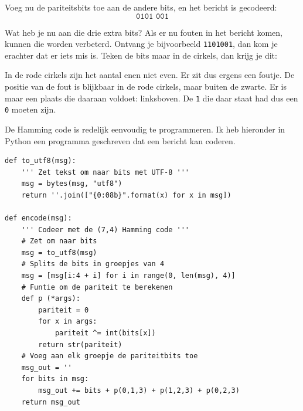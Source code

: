 \documentclass[a4paper]{article}
\begin{document}
Voeg nu de pariteitsbits toe aan de andere bits, en het bericht is gecodeerd:
\[\texttt{0101 001}\]

Wat heb je nu aan die drie extra bits? Als er nu fouten in het bericht komen, kunnen die worden verbeterd. Ontvang je bijvoorbeeld \texttt{1101001}, dan kom je erachter dat er iets mis is. Teken de bits maar in de cirkels, dan krijg je dit:
\begin{figure}[H]
    \centering
\end{figure}

In de rode cirkels zijn het aantal enen niet even. Er zit dus ergens een foutje. De positie van de fout is blijkbaar in de rode cirkels, maar buiten de zwarte. Er is maar een plaats die daaraan voldoet: linksboven. De \texttt{1} die daar staat had dus een \texttt{0} moeten zijn.

De Hamming code is redelijk eenvoudig te programmeren. Ik heb hieronder in Python een programma geschreven dat een bericht kan coderen.

\begin{verbatim}
def to_utf8(msg):
    ''' Zet tekst om naar bits met UTF-8 '''
    msg = bytes(msg, "utf8")
    return ''.join(["{0:08b}".format(x) for x in msg])

def encode(msg):
    ''' Codeer met de (7,4) Hamming code '''
    # Zet om naar bits
    msg = to_utf8(msg)
    # Splits de bits in groepjes van 4
    msg = [msg[i:4 + i] for i in range(0, len(msg), 4)]
    # Funtie om de pariteit te berekenen
    def p (*args):
        pariteit = 0
        for x in args:
            pariteit ^= int(bits[x])
        return str(pariteit)
    # Voeg aan elk groepje de pariteitbits toe
    msg_out = ''
    for bits in msg:
        msg_out += bits + p(0,1,3) + p(1,2,3) + p(0,2,3)
    return msg_out
\end{verbatim}
\end{document}
